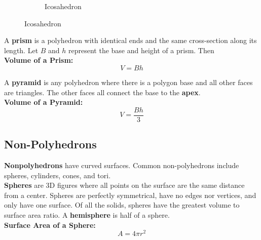 \documentclass{article}
\begin{document}
\begin{figure} [hbt!]
\begin{subfigure}[b]{.45\linewidth}
                    \caption*{Icosahedron}
                \end{subfigure}
            \end{figure}

            \noindent A \textbf{prism} is a polyhedron with identical ends and the same cross-section
            along its length. Let $B$ and $h$ represent the base and height of a prism. Then  \\

            \noindent \color{purple} \textbf{Volume of a Prism:} \color{black}
            \begin{equation*}
                V = Bh
            \end{equation*}

            \noindent A \textbf{pyramid} is any polyhedron where there is a polygon base and all
            other faces are triangles. The other faces all connect the base to the \textbf{apex}. \\

            \noindent \color{purple} \textbf{Volume of a Pyramid:} \color{black} \\
            \begin{equation*}
                V = \frac{Bh}{3}
            \end{equation*}

        \subsection{Non-Polyhedrons}
            \textbf{Nonpolyhedrons} have curved surfaces. Common non-polyhedrons include spheres,
            cylinders, cones, and tori. \\

            \noindent \textbf{Spheres} are 3D figures where all points on the surface are the same
            distance from a center. Spheres are perfectly symmetrical, have no edges nor vertices,
            and only have one surface. Of all the solids, spheres have the greatest volume to surface
            area ratio. A \textbf{hemisphere} is half of a sphere. \\

            \pagebreak
            \noindent \color{purple} \textbf{Surface Area of a Sphere:} \color{black} \\

            \begin{equation*}
                A = 4\pi r^2
            \end{equation*}
\end{document}
